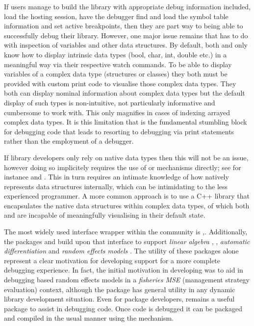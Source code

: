If users manage to build the library with appropriate debug information included, load the hosting  session, have the debugger find and 
load the symbol table information and set active breakpoints, then they are part way to being able to successfully debug their library. However, 
one major issue remains that has to do with inspection of variables and other data structures. By default, both  and  only 
know how to display intrinsic data types (bool, char, int, double etc.) in a meaningful way via their respective watch commands. To be able to 
display variables of a complex data type (structures or classes) they both must be provided with custom print code to visualise those complex 
data types. They both can display nominal information about complex data types but the default display of such types is non-intuitive, not particularly informative
and cumbersome to work with. This only magnifies in cases of indexing arrayed complex data types. It is this limitation that is the fundamental stumbling block for 
debugging code that leads to resorting to debugging via print statements rather than the employment of a debugger. 

If library developers only rely on native data types then this will not be an issue, however doing so implicitely requires the use of  or 
 mechanisms directly; see for instance \citep{DotC} and \citep{DotC2}. This in turn requires an intimate
knowledge of how  natively represents data structures internally, which can be intimidating to the less experienced programmer. A more common approach is to 
use a C++ library that encapsulates the native  data structures within complex data types, of which both  and  are  
incapable of meaningfully visualising in their default state. 

The most widely used interface wrapper within the  community is \citep{RcppIntro},\citep{Rcpp}. Additionally, the packages  
and  build upon that interface to support \emph{linear algebra} \citep{RcppEigen}, \citep{RcppEigenLA}, \emph{automatic differentiation} \citep{TMBlaplace} and 
\emph{random effects models} \citep{TMB}. The utility of these packages alone represent a clear motivation for developing support for a more complete debugging 
experience. In fact, the initial motivation in developing  was to aid in debugging  based random effects models in a 
\emph{fisheries MSE} (management strategy evaluation) context, although the package has general utility in any  dynamic library development situation.
Even for package developers,  remains a useful package to assist in debugging code. Once code is debugged it can be packaged and compiled in the usual 
manner using the  mechanism.

